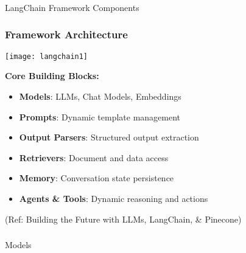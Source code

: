 \begin{frame}[fragile]\frametitle{}
\begin{center}
{\Large LangChain Framework Components}
\end{center}
\end{frame}

\begin{frame}[fragile]\frametitle{Framework Architecture}

\begin{center}
\texttt{[image: langchain1]}
\end{center}

\textbf{Core Building Blocks:}
\begin{itemize}
\item \textbf{Models}: LLMs, Chat Models, Embeddings
\item \textbf{Prompts}: Dynamic template management
\item \textbf{Output Parsers}: Structured output extraction
\item \textbf{Retrievers}: Document and data access
\item \textbf{Memory}: Conversation state persistence
\item \textbf{Agents \& Tools}: Dynamic reasoning and actions
\end{itemize}

{\tiny (Ref: Building the Future with LLMs, LangChain, \& Pinecone)}
\end{frame}

\begin{frame}[fragile]\frametitle{}
\begin{center}
{\Large Models}
\end{center}
\end{frame}

